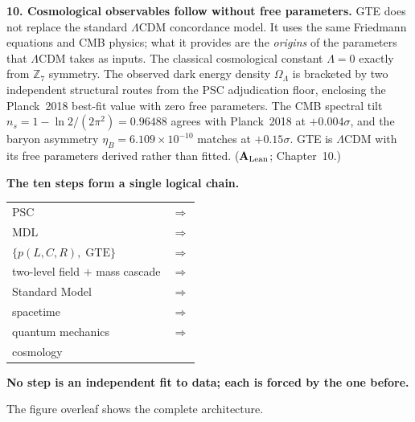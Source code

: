 \documentclass[11pt,openany]{book}
\theoremstyle{remark}
\newcommand{\CatAL}{\ensuremath{\textbf{A}_{\rm Lean}}}
\begin{document}
\medskip

\textbf{10. Cosmological observables follow without free parameters.}
GTE does not replace the standard $\Lambda$CDM concordance model.
It uses the same Friedmann equations and CMB physics; what it provides are the
\emph{origins} of the parameters that $\Lambda$CDM takes as inputs.
The classical cosmological constant $\Lambda = 0$ exactly from
$\mathbb{Z}_7$ symmetry.
The observed dark energy density $\Omega_\Lambda$ is bracketed by two
independent structural routes from the PSC adjudication floor, enclosing the
Planck~2018 best-fit value with zero free parameters.
The CMB spectral tilt $n_s = 1 - \ln 2/(2\pi^2) = 0.96488$ agrees with
Planck~2018 at $+0.004\sigma$, and the baryon asymmetry $\eta_B =
6.109\times10^{-10}$ matches at $+0.15\sigma$.
GTE is $\Lambda$CDM with its free parameters derived rather than fitted.
(\CatAL; Chapter~10.)

\begin{tcolorbox}[colback=green!6,colframe=green!55!black,
  left=10pt, right=10pt, top=8pt, bottom=8pt]
\large\bfseries The ten steps form a single logical chain.

\normalsize\mdseries\medskip
\begin{tabular}{@{}ll@{}}
$\mathrm{PSC}$ & $\Rightarrow$ \\[2pt]
$\mathrm{MDL}$ & $\Rightarrow$ \\[2pt]
$\{p(L,C,R),\;\mathrm{GTE}\}$ & $\Rightarrow$ \\[2pt]
two-level field $+$ mass cascade & $\Rightarrow$ \\[2pt]
Standard Model & $\Rightarrow$ \\[2pt]
spacetime & $\Rightarrow$ \\[2pt]
quantum mechanics & $\Rightarrow$ \\[2pt]
cosmology & \\
\end{tabular}

\medskip
\textbf{No step is an independent fit to data; each is forced by the one before.}
\end{tcolorbox}

\medskip\noindent
The figure overleaf shows the complete architecture.

\clearpage
\end{document}
